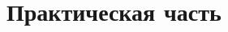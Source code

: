 \documentclass[a4paper,14pt]{extarticle} %
\newcommand{\0}{\varnothing}
\newcommand{\8}{\infty}
\theoremstyle{definition}
\newtheorem{example}{Пример}
\begin{document}





\newpage
\section{Практическая часть}
\end{document}
